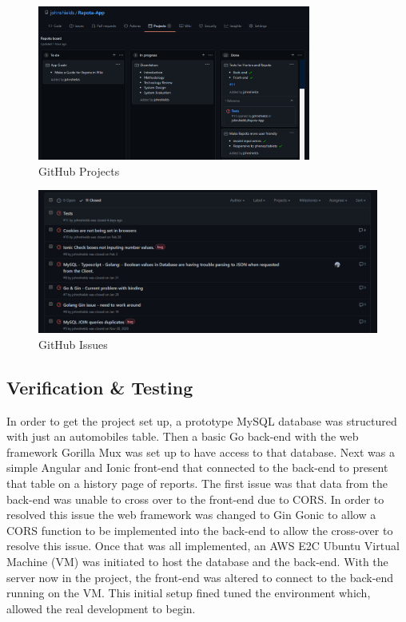 \begin{figure}[!ht]
    \caption{GitHub Projects}
    \label{image:gitProjects}
    \centering
    \includegraphics[width=0.8\textwidth]{images/misc/git-projects.png}
\end{figure}

\begin{figure}[!ht]
    \caption{GitHub Issues}
    \label{image:gitIssues}
    \centering
    \includegraphics[width=0.8
    \textwidth]{images/misc/git-issues.png}
\end{figure}

\subsection{Verification \& Testing}
In order to get the project set up, a prototype MySQL database was structured with just an automobiles table. Then a basic Go back-end with the web framework Gorilla Mux was set up to have access to that database. Next was a simple Angular and Ionic front-end that connected to the back-end to present that table on a history page of reports. The first issue was that data from the back-end was unable to cross over to the front-end due to CORS. In order to resolved this issue the web framework was changed to Gin Gonic to allow a CORS function to be implemented into the back-end to allow the cross-over to resolve this issue. Once that was all implemented, an AWS E2C Ubuntu Virtual Machine (VM) was initiated to host the database and the back-end. With the server now in the project, the front-end was altered to connect to the back-end running on the VM. This initial setup fined tuned the environment which, allowed the real development to begin. 

